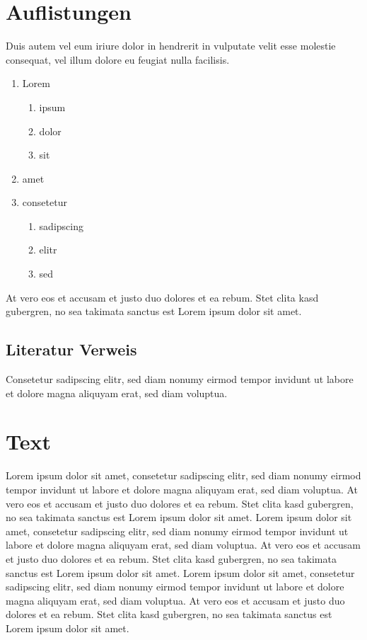 \section{Auflistungen}
Duis autem vel eum iriure dolor in hendrerit in vulputate velit esse molestie consequat, vel illum dolore eu feugiat nulla facilisis.   

\begin{enumerate}
\item Lorem
	\begin{enumerate}
	\item ipsum
	\item dolor
	\item sit
	\end{enumerate}
\item amet
\item consetetur
	\begin{enumerate}
	\item sadipscing
	\item elitr
	\item sed
	\end{enumerate}
\end{enumerate}
At vero eos et accusam et justo duo dolores et ea rebum. Stet clita kasd gubergren, no sea takimata sanctus est Lorem ipsum dolor sit amet.

\subsection{Literatur Verweis}
Consetetur\cite{TeXbook} sadipscing elitr, sed diam nonumy\cite{TeXbook} eirmod tempor invidunt ut labore et dolore magna aliquyam erat, sed diam voluptua. 

\section{Text}
Lorem ipsum dolor sit amet, consetetur sadipscing elitr, sed diam nonumy eirmod tempor invidunt ut labore et dolore magna aliquyam erat, sed diam voluptua. At vero eos et accusam et justo duo dolores et ea rebum. Stet clita kasd gubergren, no sea takimata sanctus est Lorem ipsum dolor sit amet. Lorem ipsum dolor sit amet, consetetur sadipscing elitr, sed diam nonumy eirmod tempor invidunt ut labore et dolore magna aliquyam erat, sed diam voluptua. At vero eos et accusam et justo duo dolores et ea rebum. Stet clita kasd gubergren, no sea takimata sanctus est Lorem ipsum dolor sit amet. Lorem ipsum dolor sit amet, consetetur sadipscing elitr, sed diam nonumy eirmod tempor invidunt ut labore et dolore magna aliquyam erat, sed diam voluptua. At vero eos et accusam et justo duo dolores et ea rebum. Stet clita kasd gubergren, no sea takimata sanctus est Lorem ipsum dolor sit amet.  
 
